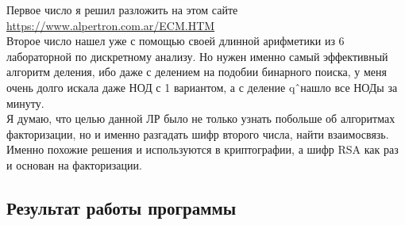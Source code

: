 \documentclass[12pt]{article}
\begin{document}
Первое число я решил разложить на этом сайте \url{https://www.alpertron.com.ar/ECM.HTM}\\
Второе число нашел уже с помощью своей длинной арифметики из 6 лабораторной по дискретному анализу. Но нужен именно самый эффективный алгоритм деления, ибо даже с делением на подобии бинарного поиска, у меня очень долго искала даже НОД с 1 вариантом, а с деление q\^\ нашло все НОДы за минуту.\\

Я думаю, что целью данной ЛР было не только узнать побольше об алгоритмах факторизации, но и именно разгадать шифр второго числа, найти взаимосвязь. Именно похожие решения и используются в криптографии, а шифр RSA как раз и основан на факторизации.


\subsection*{Результат работы программы}
\end{document}
